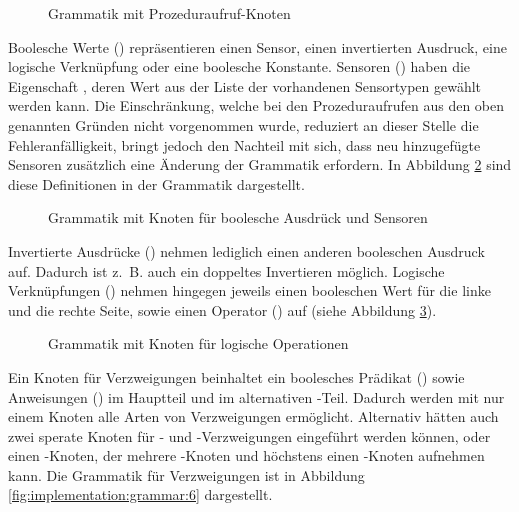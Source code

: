 \begin{figure}[h]
  
  \caption{Grammatik mit Prozeduraufruf-Knoten}
  \label{fig:implementation:grammar:3}
\end{figure}

Boolesche Werte () repräsentieren einen Sensor, einen invertierten Ausdruck, eine logische Verknüpfung oder eine boolesche Konstante. Sensoren () haben die Eigenschaft , deren Wert aus der Liste der vorhandenen Sensortypen gewählt werden kann. Die Einschränkung, welche bei den Prozeduraufrufen aus den oben genannten Gründen nicht vorgenommen wurde, reduziert an dieser Stelle die Fehleranfälligkeit, bringt jedoch den Nachteil mit sich, dass neu hinzugefügte Sensoren zusätzlich eine Änderung der Grammatik erfordern. In Abbildung \ref{fig:implementation:grammar:4} sind diese Definitionen in der Grammatik dargestellt.

\begin{figure}[h]
  
  \caption{Grammatik mit Knoten für boolesche Ausdrück und Sensoren}
  \label{fig:implementation:grammar:4}
\end{figure}

Invertierte Ausdrücke () nehmen lediglich einen anderen booleschen Ausdruck auf. Dadurch ist z.~B. auch ein doppeltes Invertieren möglich. Logische Verknüpfungen () nehmen hingegen jeweils einen booleschen Wert für die linke und die rechte Seite, sowie einen Operator () auf (siehe Abbildung \ref{fig:implementation:grammar:5}).

\begin{figure}[h]
  
  \caption{Grammatik mit Knoten für logische Operationen}
  \label{fig:implementation:grammar:5}
\end{figure}

Ein Knoten für Verzweigungen beinhaltet ein boolesches Prädikat () sowie Anweisungen () im Hauptteil und im alternativen -Teil. Dadurch werden mit nur einem Knoten alle Arten von Verzweigungen ermöglicht. Alternativ hätten auch zwei sperate Knoten für - und -Verzweigungen eingeführt werden können, oder einen -Knoten, der mehrere -Knoten und höchstens einen -Knoten aufnehmen kann. Die Grammatik für Verzweigungen ist in Abbildung \ref{fig:implementation:grammar:6} dargestellt.

